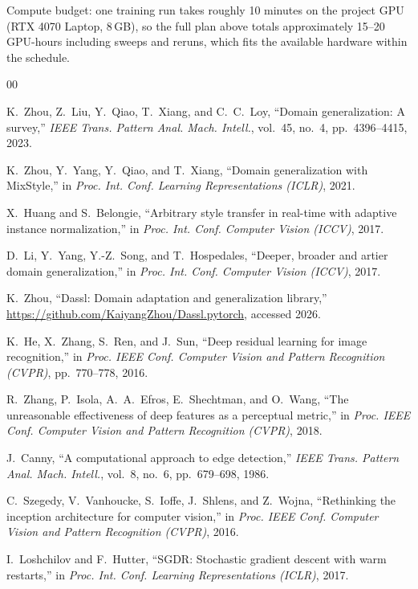 Compute budget: one training run takes roughly 10 minutes on the project GPU (RTX 4070 Laptop, 8\,GB), so the full plan above totals approximately 15--20 GPU-hours including sweeps and reruns, which fits the available hardware within the schedule.


\begin{thebibliography}{00}

K.~Zhou, Z.~Liu, Y.~Qiao, T.~Xiang, and C.~C.~Loy,
``Domain generalization: A survey,''
\textit{IEEE Trans. Pattern Anal. Mach. Intell.}, vol.~45, no.~4, pp.~4396--4415, 2023.

K.~Zhou, Y.~Yang, Y.~Qiao, and T.~Xiang,
``Domain generalization with MixStyle,''
in \textit{Proc. Int. Conf. Learning Representations (ICLR)}, 2021.

X.~Huang and S.~Belongie,
``Arbitrary style transfer in real-time with adaptive instance normalization,''
in \textit{Proc. Int. Conf. Computer Vision (ICCV)}, 2017.

D.~Li, Y.~Yang, Y.-Z.~Song, and T.~Hospedales,
``Deeper, broader and artier domain generalization,''
in \textit{Proc. Int. Conf. Computer Vision (ICCV)}, 2017.

K.~Zhou, ``Dassl: Domain adaptation and generalization library,''
\url{https://github.com/KaiyangZhou/Dassl.pytorch}, accessed 2026.

K.~He, X.~Zhang, S.~Ren, and J.~Sun,
``Deep residual learning for image recognition,''
in \textit{Proc. IEEE Conf. Computer Vision and Pattern Recognition (CVPR)}, pp.~770--778, 2016.

R.~Zhang, P.~Isola, A.~A.~Efros, E.~Shechtman, and O.~Wang,
``The unreasonable effectiveness of deep features as a perceptual metric,''
in \textit{Proc. IEEE Conf. Computer Vision and Pattern Recognition (CVPR)}, 2018.

J.~Canny,
``A computational approach to edge detection,''
\textit{IEEE Trans. Pattern Anal. Mach. Intell.}, vol.~8, no.~6, pp.~679--698, 1986.

C.~Szegedy, V.~Vanhoucke, S.~Ioffe, J.~Shlens, and Z.~Wojna,
``Rethinking the inception architecture for computer vision,''
in \textit{Proc. IEEE Conf. Computer Vision and Pattern Recognition (CVPR)}, 2016.

I.~Loshchilov and F.~Hutter,
``{SGDR}: Stochastic gradient descent with warm restarts,''
in \textit{Proc. Int. Conf. Learning Representations (ICLR)}, 2017.

\end{thebibliography}


